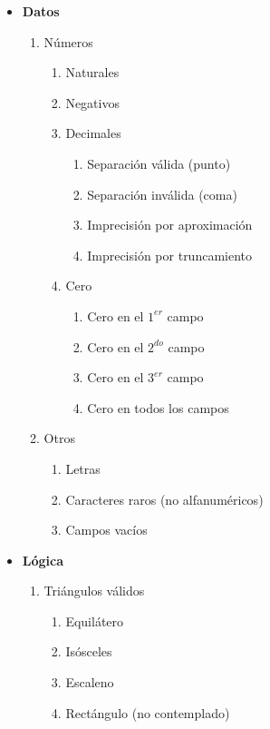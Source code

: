 \begin{itemize}
	\item \textbf{Datos}
		\begin{enumerate}[label=D\arabic*.]
			\item Números
				\begin{enumerate}[label=D1.\arabic*.]
					\item Naturales
					\item Negativos
					\item Decimales
						\begin{enumerate}[label=D1.3.\arabic*.]
							\item Separación válida (punto)
							\item Separación inválida (coma)
							\item Imprecisión por aproximación
							\item Imprecisión por truncamiento
						\end{enumerate}
					\item Cero
						\begin{enumerate}[label=D2.3.\arabic*.]
							\item Cero en el $1^{er}$ campo
							\item Cero en el $2^{do}$ campo
							\item Cero en el $3^{er}$ campo
							\item Cero en todos los campos
						\end{enumerate}
				\end{enumerate}
			\item Otros
				\begin{enumerate}[label=D2.\arabic*.]
					\item Letras
					\item Caracteres raros (no alfanuméricos)
					\item Campos vacíos
				\end{enumerate}
		\end{enumerate}
	\item \textbf{Lógica}
		\begin{enumerate}[label=L\arabic*.]
			\item Triángulos válidos
				\begin{enumerate}[label=L1.\arabic*.]
					\item Equilátero
					\item Isósceles
					\item Escaleno
					\item Rectángulo (no contemplado)
				\end{enumerate}

\end{enumerate}
\end{itemize}

